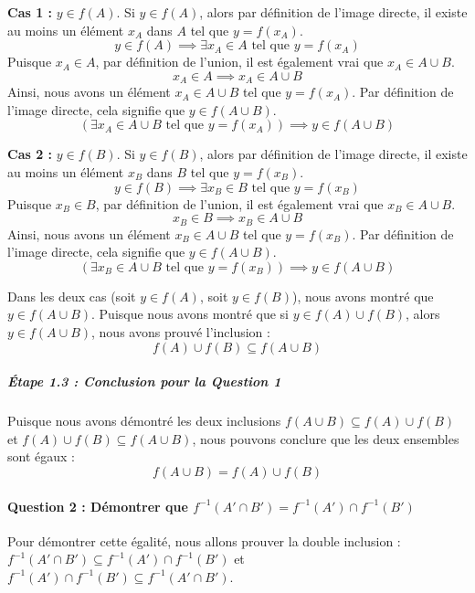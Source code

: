 \documentclass[12pt,a4paper]{report}
\begin{document}
\textbf{Cas 1 :} \(y \in f(A)\). Si \(y \in f(A)\), alors par définition
de l'image directe, il existe au moins un élément \(x_A\) dans \(A\) tel
que \(y = f(x_A)\).
\[y \in f(A) \implies \exists x_A \in A \text{ tel que } y = f(x_A)\]
Puisque \(x_A \in A\), par définition de l'union, il est également vrai
que \(x_A \in A \cup B\). \[x_A \in A \implies x_A \in A \cup B\] Ainsi,
nous avons un élément \(x_A \in A \cup B\) tel que \(y = f(x_A)\). Par
définition de l'image directe, cela signifie que \(y \in f(A \cup B)\).
\[(\exists x_A \in A \cup B \text{ tel que } y = f(x_A)) \implies y \in f(A \cup B)\]

\textbf{Cas 2 :} \(y \in f(B)\). Si \(y \in f(B)\), alors par définition
de l'image directe, il existe au moins un élément \(x_B\) dans \(B\) tel
que \(y = f(x_B)\).
\[y \in f(B) \implies \exists x_B \in B \text{ tel que } y = f(x_B)\]
Puisque \(x_B \in B\), par définition de l'union, il est également vrai
que \(x_B \in A \cup B\). \[x_B \in B \implies x_B \in A \cup B\] Ainsi,
nous avons un élément \(x_B \in A \cup B\) tel que \(y = f(x_B)\). Par
définition de l'image directe, cela signifie que \(y \in f(A \cup B)\).
\[(\exists x_B \in A \cup B \text{ tel que } y = f(x_B)) \implies y \in f(A \cup B)\]

Dans les deux cas (soit \(y \in f(A)\), soit \(y \in f(B)\)), nous avons
montré que \(y \in f(A \cup B)\). Puisque nous avons montré que si
\(y \in f(A) \cup f(B)\), alors \(y \in f(A \cup B)\), nous avons prouvé
l'inclusion : \[f(A) \cup f(B) \subseteq f(A \cup B)\]

\subparagraph{Étape 1.3 : Conclusion pour la Question
1}\label{uxe9tape-1.3-conclusion-pour-la-question-1}

Puisque nous avons démontré les deux inclusions
\(f(A \cup B) \subseteq f(A) \cup f(B)\) et
\(f(A) \cup f(B) \subseteq f(A \cup B)\), nous pouvons conclure que les
deux ensembles sont égaux : \[f(A \cup B) = f(A) \cup f(B)\]

\paragraph{\texorpdfstring{Question 2 : Démontrer que
\(f^{-1}(A' \cap B') = f^{-1}(A') \cap f^{-1}(B')\)}{Question 2 : Démontrer que f\^{}\{-1\}(A\textquotesingle{} \textbackslash cap B\textquotesingle) = f\^{}\{-1\}(A\textquotesingle) \textbackslash cap f\^{}\{-1\}(B\textquotesingle)}}\label{question-2-duxe9montrer-que-f-1a-cap-b-f-1a-cap-f-1b}

Pour démontrer cette égalité, nous allons prouver la double inclusion :
\(f^{-1}(A' \cap B') \subseteq f^{-1}(A') \cap f^{-1}(B')\) et
\(f^{-1}(A') \cap f^{-1}(B') \subseteq f^{-1}(A' \cap B')\).
\end{document}
